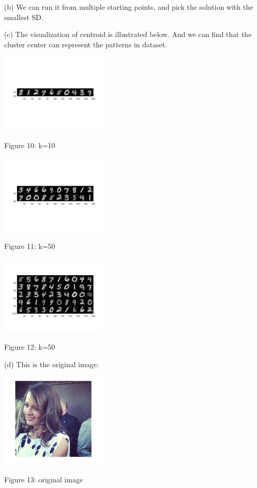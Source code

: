 \documentclass[11pt]{article} %
\begin{document}
(b) 
We can run it from multiple starting points, and pick the solution with the smallest SD.

(c)
The visualization of centroid is illustrated below. And we can find that the cluster center can represent the patterns in dataset.

\begin{center}
\includegraphics[width=2in]{kmeans_k10.jpg}  %

Figure 10: k=10
\end{center}

\begin{center}
\includegraphics[width=2in]{kmeans_k20.jpg}  %

Figure 11: k=50
\end{center}

\begin{center}
\includegraphics[width=2in]{kmeans_k50.jpg}  %

Figure 12: k=50
\end{center}


(d)
This is the original image:
\begin{center}
\includegraphics[width=2in]{aa_origin.jpg}  %

Figure 13: original image
\end{center}
\end{document}

